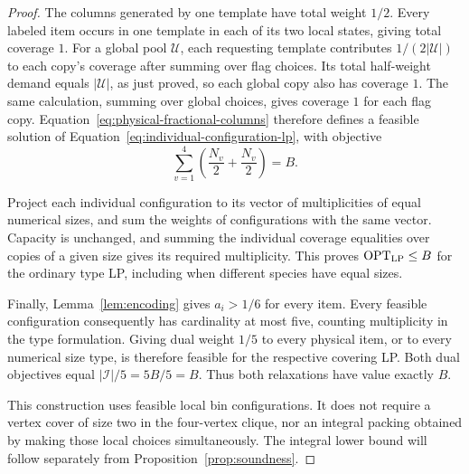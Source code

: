 \begin{proof}
The columns generated by one template have total weight $1/2$.
Every labeled item occurs in one template in each of its two local
states, giving total coverage $1$.
For a global pool $\mathcal U$, each requesting template contributes
$1/(2|\mathcal U|)$ to each copy's coverage after summing over flag
choices.  Its total half-weight demand equals $|\mathcal U|$, as
just proved, so each global copy also has coverage $1$.
The same calculation, summing over global choices, gives coverage
$1$ for each flag copy.  Equation~\eqref{eq:physical-fractional-columns}
therefore defines a feasible solution of
Equation~\eqref{eq:individual-configuration-lp}, with objective
\[
 \sum_{v=1}^4\left(\frac{N_v}{2}+\frac{N_v}{2}\right)=B.
\]

Project each individual configuration to its vector of multiplicities
of equal numerical sizes, and sum the weights of configurations
with the same vector.  Capacity is unchanged, and summing the
individual coverage equalities over copies of a given size gives
its required multiplicity.  This proves $\operatorname{OPT}_{\mathrm{LP}}\le B$ for the ordinary
type LP, including when different species have equal sizes.

Finally, Lemma~\ref{lem:encoding} gives $a_i>1/6$ for every item.
Every feasible configuration consequently has cardinality at most
five, counting multiplicity in the type formulation.  Giving dual
weight $1/5$ to every physical item, or to every numerical size
type, is therefore feasible for the respective covering LP.
Both dual objectives equal $|\mathcal I|/5=5B/5=B$.
Thus both relaxations have value exactly $B$.

This construction uses feasible local bin configurations.  It does
not require a vertex cover of size two in the four-vertex clique,
nor an integral packing obtained by making those local choices
simultaneously.  The integral lower bound will follow separately
from Proposition~\ref{prop:soundness}.
\end{proof}

